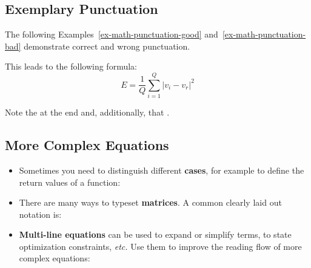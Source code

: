 \documentclass[11pt,a4paper]{article}
\begin{document}
\subsection{Exemplary Punctuation}
\label{sec-math:punctuation}
The following Examples~\ref{ex-math-punctuation-good} and~\ref{ex-math-punctuation-bad} demonstrate correct and wrong punctuation.
\begin{goodexample}
  \label{ex-math-punctuation-good}
  
\end{goodexample}

\begin{badexample}
  \label{ex-math-punctuation-bad}
  This leads to the following formula:
    \begin{equation}
    E = \frac{1}{Q} \sum_{i=1}^{Q}{|v_i - v_r|^2}
    \end{equation}

    Note the  at the end and, additionally, that .
\end{badexample}

\vfill
\subsection{More Complex Equations}
\label{sec-math:examples}
\begin{itemize}
 \item Sometimes you need to distinguish different \textbf{cases}, for example to define the return values of a function:
 \vspace{-1em}
\begin{texexample}
  
  
\end{texexample}


\item There are many ways to typeset \textbf{matrices}. A common clearly laid out notation is:
\begin{texexample}
  
  
\end{texexample}

\item \textbf{Multi-line equations} can be used to expand or simplify terms, to state optimization constraints, \emph{etc.}
Use them to improve the reading flow of more complex equations:
\vspace{-1em}
\begin{texexample}
  
  
\end{texexample}
\end{itemize}
\end{document}
